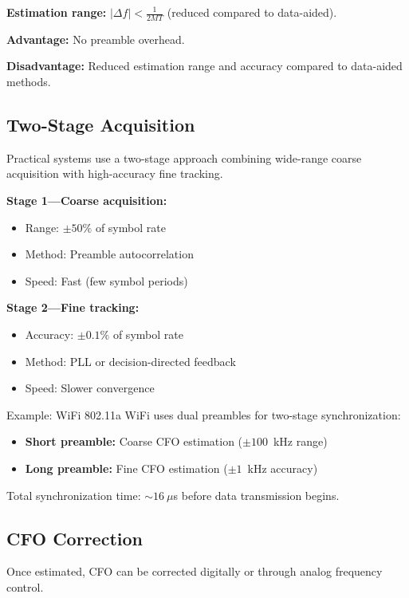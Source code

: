 \textbf{Estimation range:} $|\Delta f| < \frac{1}{2MT}$ (reduced compared to data-aided).

\textbf{Advantage:} No preamble overhead.

\textbf{Disadvantage:} Reduced estimation range and accuracy compared to data-aided methods.

\subsection{Two-Stage Acquisition}

Practical systems use a two-stage approach combining wide-range coarse acquisition with high-accuracy fine tracking.

\textbf{Stage 1---Coarse acquisition:}
\begin{itemize}
\item Range: $\pm 50\%$ of symbol rate
\item Method: Preamble autocorrelation
\item Speed: Fast (few symbol periods)
\end{itemize}

\textbf{Stage 2---Fine tracking:}
\begin{itemize}
\item Accuracy: $\pm 0.1\%$ of symbol rate
\item Method: PLL or decision-directed feedback
\item Speed: Slower convergence
\end{itemize}

\begin{calloutbox}{Example: WiFi 802.11a}
WiFi uses dual preambles for two-stage synchronization:
\begin{itemize}
\item \textbf{Short preamble:} Coarse CFO estimation ($\pm 100$~kHz range)
\item \textbf{Long preamble:} Fine CFO estimation ($\pm 1$~kHz accuracy)
\end{itemize}
Total synchronization time: $\sim 16~\mu$s before data transmission begins.
\end{calloutbox}

\subsection{CFO Correction}

Once estimated, CFO can be corrected digitally or through analog frequency control.

